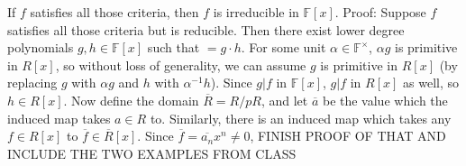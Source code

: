 \documentclass[12pt]{article}
\begin{document}
If $f$ satisfies all those criteria, then $f$ is irreducible in $\mathbb{F}[x]$. Proof: Suppose $f$ satisfies all those criteria but is reducible. Then there exist lower degree polynomials $g,h \in \mathbb{F}[x]$ such that $=g \cdot h$. For some unit $\alpha \in \mathbb{F}^\times$, $\alpha g$ is primitive in $R[x]$, so without loss of generality, we can assume $g$ is primitive in $R[x]$ (by replacing $g$ with $\alpha g$ and $h$ with $\alpha^{-1} h$). Since $g|f$ in $\mathbb{F}[x]$, $g|f$ in $R[x]$ as well, so $h \in R[x]$. Now define the domain $\overline{R} = R/pR$, and let $\overline{a}$ be the value which the induced map takes $a \in R$ to. Similarly, there is an induced map which takes any $f \in R[x]$ to $\overline{f} \in \overline{R}[x]$. Since $\overline{f} = \overline{a_n} x^n \neq 0$,
FINISH PROOF OF THAT AND INCLUDE THE TWO EXAMPLES FROM CLASS
\end{document}
